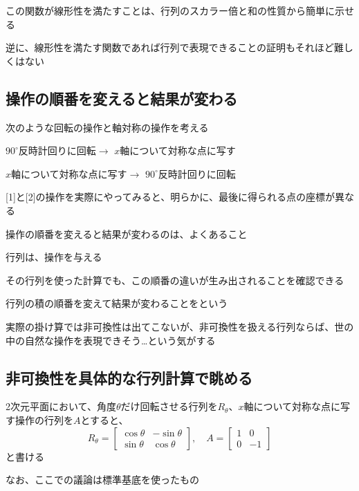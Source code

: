 \documentclass[../book_half_step_linear]{subfiles}
\begin{document}
この関数が線形性を満たすことは、行列のスカラー倍と和の性質から簡単に示せる

逆に、線形性を満たす関数であれば行列で表現できることの証明もそれほど難しくはない

\sectionline
\subsection{操作の順番を変えると結果が変わる}

次のような回転の操作と軸対称の操作を考える
\begin{enumerate}[label={[\arabic*]}]
  \item $90^\circ$反時計回りに回転$\to$ $x$軸について対称な点に写す
  \item $x$軸について対称な点に写す$\to$ $90^\circ$反時計回りに回転
\end{enumerate}

[1]と[2]の操作を実際にやってみると、明らかに、最後に得られる点の座標が異なる

操作の順番を変えると結果が変わるのは、よくあること

\br

行列は、操作を与える

その行列を使った計算でも、この順番の違いが生み出されることを確認できる

行列の積の順番を変えて結果が変わることをという

実際の掛け算では非可換性は出てこないが、非可換性を扱える行列ならば、世の中の自然な操作を表現できそう…という気がする

\sectionline
\subsection{非可換性を具体的な行列計算で眺める}

2次元平面において、角度$\theta$だけ回転させる行列を$R_\theta$、$x$軸について対称な点に写す操作の行列を$A$とすると、
\begin{equation*}
  R_\theta = \begin{bmatrix}
    \cos\theta & -\sin\theta \\
    \sin\theta & \cos\theta
  \end{bmatrix}, \quad
  A       = \begin{bmatrix}
    1 & 0  \\
    0 & -1
  \end{bmatrix}
\end{equation*}
と書ける

なお、ここでの議論は標準基底を使ったもの
\end{document}
